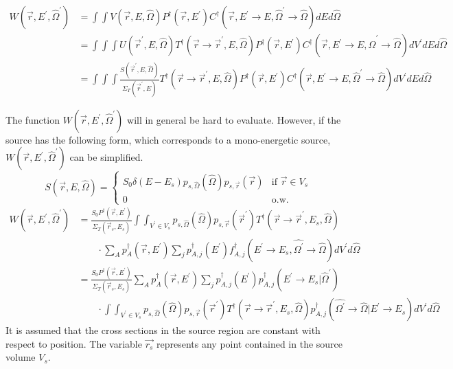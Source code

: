 \begin{align}
  W(\vec{r},E^{'},\hat{\Omega}^{'}) & = \int\int V(\vec{r},E,\hat{\Omega})
  P^{\dagger}(\vec{r},E^{'})
  C^{\dagger}(\vec{r},E^{'} \to E,\hat{\Omega}^{'} \to \hat{\Omega})dEd\hat{\Omega}
  \nonumber \\
  & = \int\int\int U(\vec{r}^{'},E,\hat{\Omega})
  T^{\dagger}(\vec{r} \to \vec{r}^{'},E,\hat{\Omega}) P^{\dagger}(\vec{r},E^{'})
  C^{\dagger}(\vec{r},E^{'} \to E, \hat{\Omega}^{'} \to \hat{\Omega})
  dV^{'}dEd\hat{\Omega} \nonumber \\
  & = \int\int\int \frac{S(\vec{r}^{'},E,\hat{\Omega})}
  {\Sigma_T(\vec{r}^{'},E)}
  T^{\dagger}(\vec{r} \to \vec{r}^{'},E,\hat{\Omega}) P^{\dagger}(\vec{r},E^{'})
  C^{\dagger}(\vec{r},E^{'} \to E, \hat{\Omega}^{'} \to \hat{\Omega})
  dV^{'}dEd\hat{\Omega}
\end{align}

The function $W(\vec{r},E^{'},\hat{\Omega}^{'})$ will in general be hard to 
evaluate. However, if the source has the following form, which corresponds to
a mono-energetic source, $W(\vec{r},E^{'},\hat{\Omega}^{'})$ can be simplified. 
\begin{equation}
  S(\vec{r},E,\hat{\Omega}) = 
  \begin{cases}
    S_0 \delta(E - E_s) p_{s,\hat{\Omega}}(\hat{\Omega})p_{s,\vec{r}}(\vec{r}) 
    & \text{if } \vec{r} \in V_s \\
    0 & \text{o.w.}
  \end{cases}
\end{equation}
\begin{align}
  W(\vec{r},E^{'},\hat{\Omega}^{'}) & = \frac{S_0 P^{\dagger}(\vec{r},E^{'})}
  {\Sigma_T(\vec{r}_s,E_s)}\int\int_{V^{'} \in V_s} p_{s,\hat{\Omega}}(\hat{\Omega})
  p_{s,\vec{r}}(\vec{r}^{'}) T^{\dagger}(\vec{r} \to \vec{r}^{'},E_s,\hat{\Omega})
  \nonumber \\
  & \qquad\cdot 
  \sum_A p_A^{\dagger}(\vec{r},E^{'}) \sum_j p_{A,j}^{\dagger}(E^{'})
  f_{A,j}^{\dagger}(E^{'} \to E_s,\hat{\Omega^{'}} \to \hat{\Omega}) 
  dV^{'}d\hat{\Omega} \nonumber \\
  & = \frac{S_0 P^{\dagger}(\vec{r},E^{'})}{\Sigma_T(\vec{r}_s,E_s)}
  \sum_A p_A^{\dagger}(\vec{r},E^{'}) \sum_j p_{A,j}^{\dagger}(E^{'})
  p_{A,j}^{\dagger}(E^{'} \to E_s|\hat{\Omega}^{'}) \nonumber \\
  & \qquad\cdot \int\int_{V^{'} \in V_s} 
  p_{s,\hat{\Omega}}(\hat{\Omega}) p_{s,\vec{r}}(\vec{r}^{'}) 
  T^{\dagger}(\vec{r} \to \vec{r}^{'},E_s,\hat{\Omega})
  p_{A,j}^{\dagger}(\hat{\Omega^{'}} \to \hat{\Omega}|E^{'} \to E_s) 
  dV^{'}d\hat{\Omega} \nonumber
\end{align}
It is assumed that the cross sections in the source region are constant with 
respect to position. The variable $\vec{r_s}$ represents any point contained in
the source volume $V_s$.

